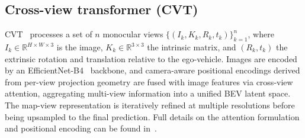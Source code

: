 \documentclass[12pt]{article}
\begin{document}
%
%
%
%
%
%

\subsection{Cross-view transformer (CVT)}
\label{sec:cvt_exp}

CVT~\cite{park2023cvt} processes a set of $n$ monocular views $\{(I_k, K_k, R_k, t_k)\}_{k=1}^n$, where $I_k \in \mathbb{R}^{H \times W \times 3}$ is the image, $K_k \in \mathbb{R}^{3 \times 3}$ the intrinsic matrix, and $(R_k, t_k)$ the extrinsic rotation and translation relative to the ego-vehicle. Images are encoded by an EfficientNet-B4~\cite{tan2019efficientnet} backbone, and camera-aware positional encodings derived from per-view projection geometry are fused with image features via cross-view attention, aggregating multi-view information into a unified BEV latent space. The map-view representation is iteratively refined at multiple resolutions before being upsampled to the final prediction. Full details on the attention formulation and positional encoding can be found in~\cite{park2023cvt}.
\end{document}
